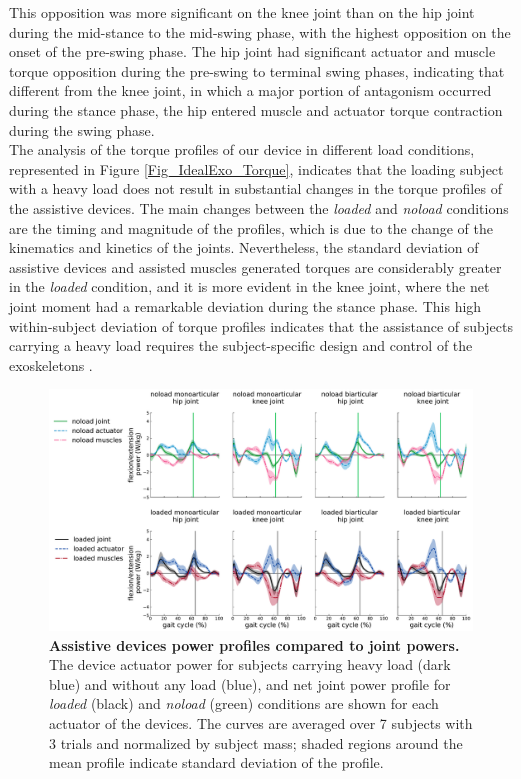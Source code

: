 \documentclass[10pt,letterpaper]{article}
\begin{document}
This opposition was more significant on the knee joint than on the hip joint during the mid-stance to the mid-swing phase, with the highest opposition on the onset of the pre-swing phase. The hip joint had significant actuator and muscle torque opposition during the pre-swing to terminal swing phases, indicating that different from the knee joint, in which a major portion of antagonism occurred during the stance phase, the hip entered muscle and actuator torque contraction during the swing phase. \\
The analysis of the torque profiles of our device in different load conditions, represented in Figure \ref{Fig_IdealExo_Torque}, indicates that the loading subject with a heavy load does not result in substantial changes in the torque profiles of the assistive devices. The main changes between the \textit{loaded} and \textit{noload} conditions are the timing and magnitude of the profiles, which is due to the change of the  kinematics and kinetics of the joints.
Nevertheless, the standard deviation of assistive devices and assisted muscles generated torques are considerably greater in the \textit{loaded} condition, and it is more evident in the knee joint, where the net joint moment had a remarkable deviation during the stance phase. This high within-subject deviation of torque profiles indicates that the assistance of subjects carrying a heavy load requires the subject-specific design and control of the exoskeletons \cite{2}.\\
\begin{figure}[ht]   
	\centering
	\includegraphics[width=\linewidth]{Ideal_Exo_MonovsBi_Figures/PaperFigure_Exoskeletons_Power.pdf}
	\vspace{1mm}
	\caption{{\small\textbf{Assistive devices power profiles compared to joint powers.} The device actuator power for subjects carrying heavy load (dark blue) and without any load (blue), and net joint power profile for \textit{loaded} (black) and \textit{noload} (green) conditions are shown for each actuator of the devices. The curves are averaged over 7 subjects with 3 trials and normalized by subject mass; shaded regions around the mean profile indicate standard deviation of the profile.}}
	\label{Fig_IdealExo_Power}
\end{figure}
\end{document}

